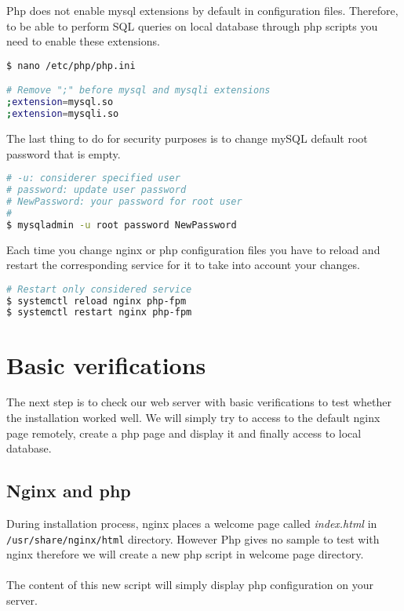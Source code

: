 Php does not enable mysql extensions by default in configuration files. Therefore, 
to be able to perform SQL queries on local database through php scripts you need 
to enable these extensions.
\begin{lstlisting}[language=bash,caption=Enable php in nginx]
$ nano /etc/php/php.ini

# Remove ";" before mysql and mysqli extensions
;extension=mysql.so
;extension=mysqli.so
\end{lstlisting}

The last thing to do for security purposes is to change mySQL default root 
password that is empty.
\begin{lstlisting}[language=bash,caption=Change mySQL root password]
# -u: considerer specified user
# password: update user password
# NewPassword: your password for root user
#
$ mysqladmin -u root password NewPassword
\end{lstlisting}

Each time you change nginx or php configuration files you have to reload and 
restart the corresponding service for it to take into account your changes.
\begin{lstlisting}[language=bash,caption=Reload and restart a service]
# Restart only considered service
$ systemctl reload nginx php-fpm 
$ systemctl restart nginx php-fpm
\end{lstlisting}

\section{Basic verifications}
The next step is to check our web server with basic verifications to test whether
the installation worked well. We will simply try to access to the default nginx 
page remotely, create a php page and display it and finally access to local 
database. 

\subsection{Nginx and php}
During installation process, nginx places a welcome page called \emph{index.html} 
in \texttt{/usr/share/nginx/html} directory. However Php gives no sample to test 
with nginx therefore we will create a new php script in welcome page directory.
\\\\
The content of this new script will simply display php configuration on 
your server.
\lstset{language=php,caption=Php simple script}


